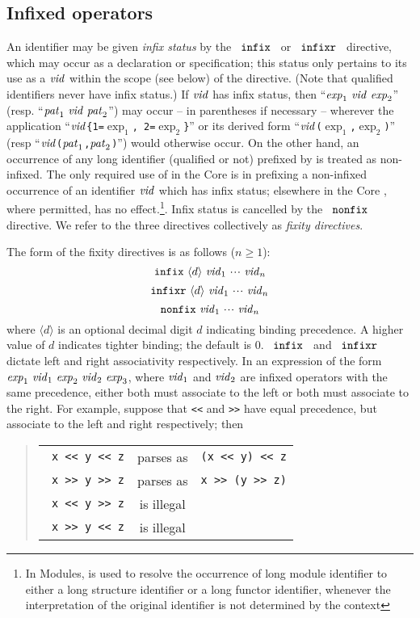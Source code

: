 \subsection{Infixed operators}
An identifier may be given {\sl infix status} by the
~${\tt infix}$~ or ~${\tt infixr}$~ directive, which may occur as a
declaration or specification; 
this status only pertains to its use as a ${\it vid}$ within the scope
(see below) of the directive.
(Note that qualified identifiers never have infix status.)  If ${\it vid}$
has infix status, then ``${\it exp}_1\ {\it vid}\ {\it exp}_2$'' (resp. ``${\it pat}_1\
{\it vid}\ {\it pat}_2$'') may occur -- in parentheses if necessary -- wherever
the application ``${\it vid}$\verb+{+{\tt 1=}$\exp_1$\verb+,+{\tt
2=}$\exp_2$\verb+}+'' or its derived form
``${\it vid}$\verb+(+$\exp_1$\verb+,+$\exp_2$\verb+)+'' (resp
``${\it vid}$\verb+(+${\it pat}_1$\verb+,+${\it pat}_2$\verb+)+'') would otherwise
occur.  On the other hand, an occurrence of any long identifier (qualified
or not) prefixed by {\OP} is treated as non-infixed. The only required
use of {\OP} in the Core is in prefixing a non-infixed occurrence of an
identifier ${\it vid}$ which has infix status; elsewhere in the Core {\OP}, where
permitted, has no effect.\index{9.1}\footnote{In Modules, {\OP} is used
to resolve the occurrence of long module identifier to either a
long structure identifier or a long functor identifier,
whenever the interpretation of the original identifier is not 
determined by the context}.
Infix status is cancelled by the ~${\tt nonfix}$~
directive.  We refer to the three directives collectively as {\sl
fixity directives}.

The form of the fixity directives is as follows ($n\geq 1$):
\[ \mbox{${\tt infix}\ \langle d\rangle\ {\it vid}_1\ \mbox{$\cdot\!\cdot\!\cdot$}\ {\it vid}_n$} \]
\[ \mbox{${\tt infixr}\ \langle d\rangle\ {\it vid}_1\ \mbox{$\cdot\!\cdot\!\cdot$}\ {\it vid}_n$} \]
\[ \mbox{${\tt nonfix}\ {\it vid}_1\ \mbox{$\cdot\!\cdot\!\cdot$}\ {\it vid}_n$} \]
where $\langle d\rangle$ is an optional decimal digit $d$ indicating
binding precedence. A higher value of $d$ indicates tighter binding;
the default is $0$.
~${\tt infix}$~ and ~${\tt infixr}$~ dictate left and right
associativity respectively.
In an expression of the form 
 ${\it exp}_1\ {\it vid}_1\ {\it exp}_2\ {\it vid}_2\ {\it exp}_3$, 
where ${\it vid}_1$ and ${\it vid}_2$ are infixed operators with the same precedence, either both must associate to the left or both must associate to the right. For example, suppose that \verb+<<+ and \verb+>>+ have equal precedence, but associate to the left and right respectively; then
\begin{quote}
\begin{tabular}{rcl}
\verb+x << y << z+ & parses as & \verb+(x << y) << z+ \\
\verb+x >> y >> z+ & parses as & \verb+x >> (y >> z)+ \\
\verb+x << y >> z+ & is illegal & \\
\verb+ x >> y << z+ & is illegal & 
\end{tabular}
\end{quote}

